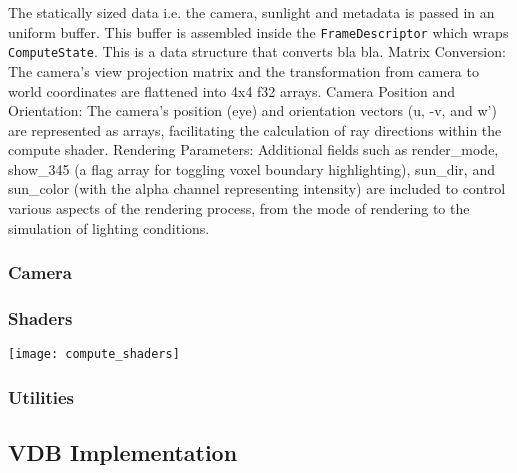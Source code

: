 The statically sized data i.e. the camera, sunlight and metadata is passed in an uniform buffer. This buffer is assembled inside the \verb|FrameDescriptor| which wraps \verb|ComputeState|.
This is a data structure that converts bla bla.
Matrix Conversion: The camera's view projection matrix and the transformation from camera to world coordinates are flattened into 4x4 f32 arrays.
Camera Position and Orientation: The camera's position (eye) and orientation vectors (u, -v, and w') are represented as arrays, facilitating the calculation of ray directions within the compute shader.
Rendering Parameters: Additional fields such as render\_mode, show\_345 (a flag array for toggling voxel boundary highlighting), sun\_dir, and sun\_color (with the alpha channel representing intensity) are included to control various aspects of the rendering process, from the mode of rendering to the simulation of lighting conditions.



\subsubsection{Camera}

\subsubsection{Shaders}
\texttt{[image: compute\_shaders]}

\subsubsection{Utilities}

\subsection{VDB Implementation}
